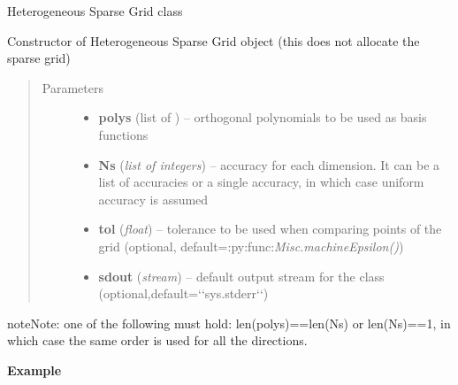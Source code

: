 \documentclass[letterpaper,10pt,english]{sphinxmanual}
\begin{document}
\begin{fulllineitems}
\label{index:SpectralToolbox.HeterogeneousSparseGrids.HSparseGrid}
Heterogeneous Sparse Grid class

Constructor of Heterogeneous Sparse Grid object (this does not allocate the sparse grid)
\begin{quote}\begin{description}
\item[{Parameters}] \leavevmode\begin{itemize}
\item {} 
\textbf{polys} (list of ) -- orthogonal polynomials to be used as basis functions

\item {} 
\textbf{Ns} (\emph{list of integers}) -- accuracy for each dimension. It can be a list of accuracies or a single accuracy, in which case uniform accuracy is assumed

\item {} 
\textbf{tol} (\emph{float}) -- tolerance to be used when comparing points of the grid (optional, default=:py:func:\emph{Misc.machineEpsilon()})

\item {} 
\textbf{sdout} (\emph{stream}) -- default output stream for the class (optional,default={}`{}`sys.stderr{}`{}`)

\end{itemize}

\end{description}\end{quote}

\begin{notice}{note}{Note:}
one of the following must hold: len(polys)==len(Ns) or len(Ns)==1, in which case the same order is used for all the directions.
\end{notice}

\textbf{Example}


\end{fulllineitems}
\end{document}
